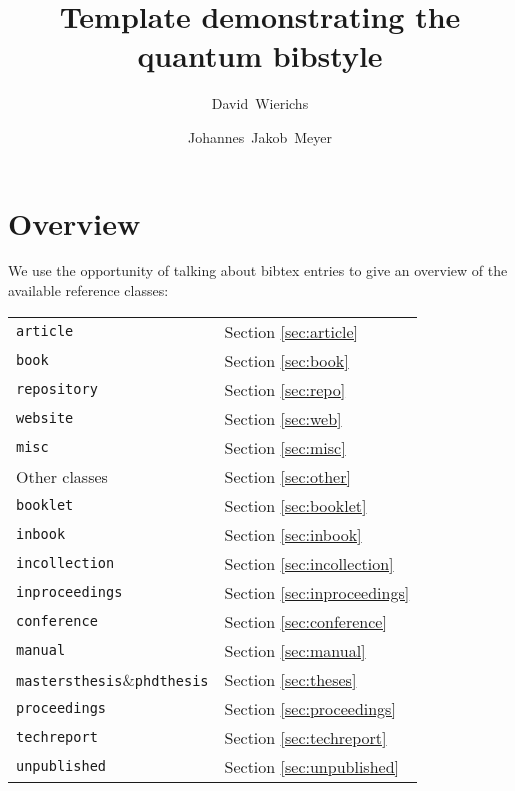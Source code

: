 \documentclass[a4paper,twocolumn,11pt]{quantumarticle}
\begin{document}
\title{Template demonstrating the quantum bibstyle}

\author{David~Wierichs}
\author{Johannes~Jakob~Meyer}

\maketitle

\section{Overview}\label{sec:overview}

We use the opportunity of talking about bibtex entries to give an overview of the available reference classes:

\begin{center}
\begin{tabular}{ll}
    \texttt{article} & Section \ref{sec:article}\\
    \texttt{book} & Section \ref{sec:book}\\
    \texttt{repository} & Section \ref{sec:repo}\\
    \texttt{website} & Section \ref{sec:web}\\
    \texttt{misc} & Section \ref{sec:misc}\\
    Other classes & Section \ref{sec:other}\\
    \hspace{0.8cm}\texttt{booklet} & Section \ref{sec:booklet}\\
    \hspace{0.8cm}\texttt{inbook} & Section \ref{sec:inbook}\\
    \hspace{0.8cm}\texttt{incollection} & Section \ref{sec:incollection}\\
    \hspace{0.8cm}\texttt{inproceedings} & Section \ref{sec:inproceedings}\\
    \hspace{0.8cm}\texttt{conference} & Section \ref{sec:conference}\\
    \hspace{0.8cm}\texttt{manual} & Section \ref{sec:manual}\\
    \hspace{0.8cm}\texttt{mastersthesis}\&\texttt{phdthesis} & Section \ref{sec:theses}\\
    \hspace{0.8cm}\texttt{proceedings} & Section \ref{sec:proceedings}\\
    \hspace{0.8cm}\texttt{techreport} & Section \ref{sec:techreport}\\
    \hspace{0.8cm}\texttt{unpublished} & Section \ref{sec:unpublished}\\
\end{tabular}
\end{center}
\end{document}
